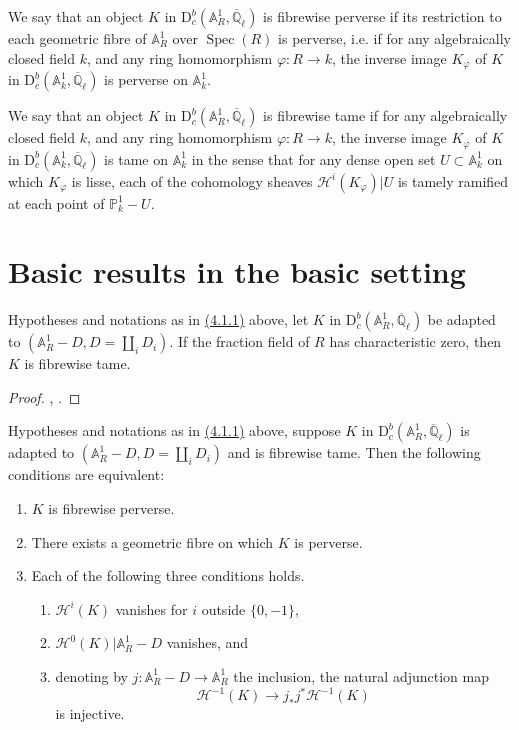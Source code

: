 We say that an object \(K\) in
\(\mathrm{D}^b_c(\mathbb{A}^1_R,\overline{\mathbb{Q}}_\ell)\) is fibrewise
perverse if its restriction to each geometric fibre of \(\mathbb{A}^1_R\) over
\(\operatorname{Spec}(R)\) is perverse, i.e. if for any algebraically closed
field \(k\), and any ring homomorphism \(\varphi:R\to k\), the inverse image
\(K_\varphi\) of \(K\) in
\(\mathrm{D}^b_c(\mathbb{A}^1_k,\overline{\mathbb{Q}}_\ell)\) is perverse on
\(\mathbb{A}^1_k\).

We say that an object \(K\) in
\(\mathrm{D}^b_c(\mathbb{A}^1_R,\overline{\mathbb{Q}}_\ell)\) is fibrewise
tame if for any algebraically closed field \(k\), and any ring homomorphism
\(\varphi:R\to k\), the inverse image \(K_\varphi\) of \(K\) in
\(\mathrm{D}^b_c(\mathbb{A}^1_k,\overline{\mathbb{Q}}_\ell)\) is tame on
\(\mathbb{A}^1_k\) in the sense that for any dense open set
\(U\subset\mathbb{A}^1_k\) on which \(K_\varphi\) is lisse, each of the
cohomology sheaves \(\mathcal{H}^i(K_\varphi)\vert U\) is tamely ramified at
each point of \(\mathbb{P}^1_k-U\).

\section{Basic results in the basic setting}\label{sec:4.2}

Hypotheses and notations as in \hyperref[par:4.1.1]{(4.1.1)} above, let \(K\)
in \(\mathrm{D}^b_c(\mathbb{A}^1_R,\overline{\mathbb{Q}}_\ell)\) be adapted to
\((\mathbb{A}^1_R-D,D=\coprod_iD_i)\). If the fraction field of \(R\) has
characteristic zero, then \(K\) is fibrewise tame.

\begin{proof}
\cite[4.7.1 and Remarque (ii)]{Ka-SE}, \cite[SGA 1, Exposé XIII, 5.5]{SGA}.
\end{proof}

Hypotheses and notations as in \hyperref[par:4.1.1]{(4.1.1)} above, suppose
\(K\) in \(\mathrm{D}^b_c(\mathbb{A}^1_R,\overline{\mathbb{Q}}_\ell)\) is
adapted to \((\mathbb{A}^1_R-D,D=\coprod_iD_i)\) and is fibrewise tame. Then
the following conditions are equivalent:
\begin{enumerate}[label=(\arabic*)]
\item \(K\) is fibrewise perverse.
\item There exists a geometric fibre on which \(K\) is perverse.
\item Each of the following three conditions holds.
  \begin{enumerate}[label=(\roman*)]
  \item \(\mathcal{H}^i(K)\) vanishes for \(i\) outside \(\{0,-1\}\),
  \item \(\mathcal{H}^0(K)\vert\mathbb{A}^1_R-D\) vanishes, and
  \item denoting by
  \(j:\mathbb{A}^1_R-D\to\mathbb{A}^1_R\) the inclusion, the natural
  adjunction map
  \[
    \mathcal{H}^{-1}(K)\to j_*j^*\mathcal{H}^{-1}(K)
  \]
  is injective.
  \end{enumerate}
\end{enumerate}

